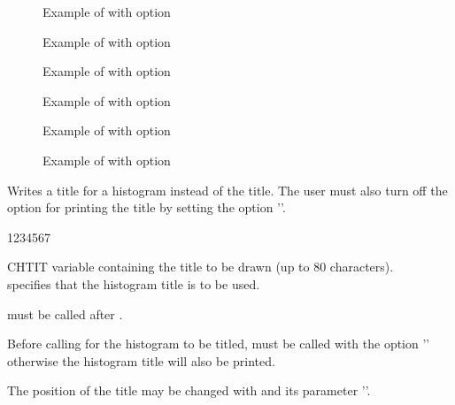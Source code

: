 \begin{figure}[p]
\begin{center} \mbox{}\end{center}
\caption{Example of \protect{} with \protect{} option}
\begin{center} \mbox{}\end{center}
\caption{Example of \protect{} with \protect{} option}
\end{figure}

\begin{figure}[p]
\begin{center} \mbox{}\end{center}
\caption{Example of \protect{} with \protect{} option}
\begin{center}\mbox{}\end{center}
\caption{Example of \protect{} with \protect{} option}
\end{figure}

\begin{figure}[p]
\begin{center} \mbox{}\end{center}
\caption{Example of \protect{} with \protect{} option}
\begin{center} \mbox{}\end{center}
\caption{Example of \protect{} with \protect{} option}
\end{figure}
\clearpage


\Action
Writes a title for a histogram instead of the \HBOOK{} title. The user must also
turn off the option for printing the \HBOOK{} title by setting the option 
''.
\Pdesc
\begin{DLtt}{1234567}
\item[CHTIT] \CHARACTER{} variable containing the title to be drawn
             (up to 80 characters).\\
              specifies that the \HBOOK{} histogram title is 
             to be used.
\end{DLtt}
\Remarks
\begin{UL}
\item {} must be called after \HPLOT.
\item Before calling \HPLOT{} for the histogram to be titled,  must
      be called with the option '' otherwise the \HBOOK{} histogram 
      title will also be printed.
\item The position of the title may be changed with  and its 
      parameter ''.
\end{UL}


